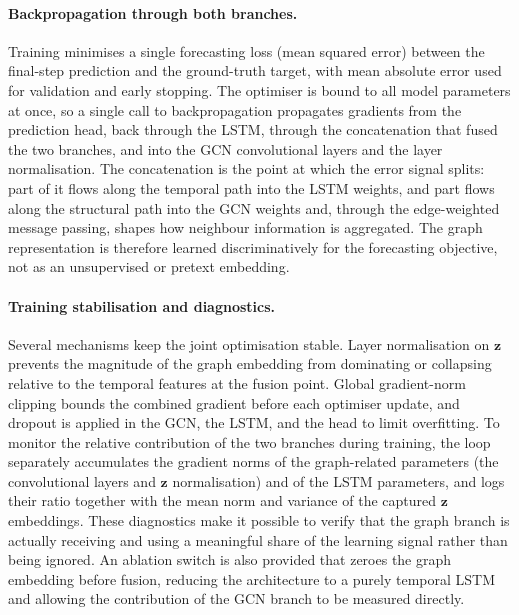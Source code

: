 \paragraph{Backpropagation through both branches.}
Training minimises a single forecasting loss (mean squared error) between the
final-step prediction and the ground-truth target, with mean absolute error
used for validation and early stopping. The optimiser is bound to all model
parameters at once, so a single call to backpropagation propagates gradients
from the prediction head, back through the LSTM, through the concatenation that
fused the two branches, and into the GCN convolutional layers and the layer
normalisation. The concatenation is the point at which the error signal splits:
part of it flows along the temporal path into the LSTM weights, and part flows
along the structural path into the GCN weights and, through the edge-weighted
message passing, shapes how neighbour information is aggregated. The graph
representation is therefore learned discriminatively for the forecasting
objective, not as an unsupervised or pretext embedding.

\paragraph{Training stabilisation and diagnostics.}
Several mechanisms keep the joint optimisation stable. Layer normalisation on
$\mathbf{z}$ prevents the magnitude of the graph embedding from dominating or
collapsing relative to the temporal features at the fusion point. Global
gradient-norm clipping bounds the combined gradient before each optimiser
update, and dropout is applied in the GCN, the LSTM, and the head to limit
overfitting. To monitor the relative contribution of the two branches during
training, the loop separately accumulates the gradient norms of the
graph-related parameters (the convolutional layers and $\mathbf{z}$
normalisation) and of the LSTM parameters, and logs their ratio together with
the mean norm and variance of the captured $\mathbf{z}$ embeddings. These
diagnostics make it possible to verify that the graph branch is actually
receiving and using a meaningful share of the learning signal rather than being
ignored. An ablation switch is also provided that zeroes the graph embedding
before fusion, reducing the architecture to a purely temporal LSTM and allowing
the contribution of the GCN branch to be measured directly.


